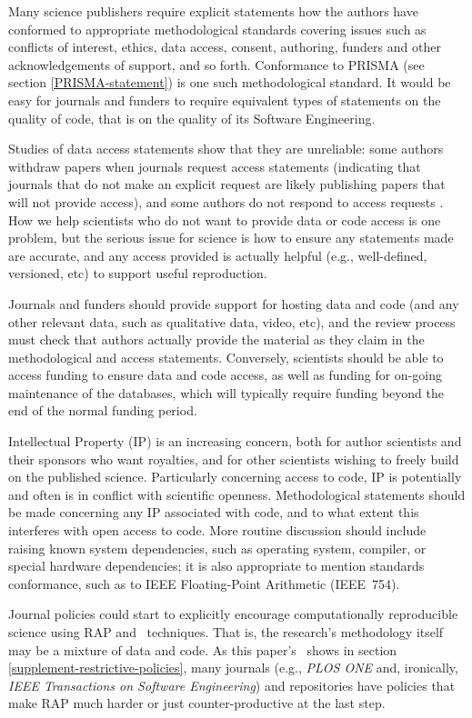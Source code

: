 \documentclass{comjnl}
\begin{document}
Many science publishers require explicit statements how the authors have conformed to appropriate methodological standards covering issues such as conflicts of interest, ethics, data access, consent, authoring, funders and other acknowledgements of support, and so forth. Conformance to PRISMA (see section \ref{PRISMA-statement}) is one such methodological standard. It would be easy for journals and funders to require equivalent types of statements on the quality of code, that is on the quality of its Software Engineering.

Studies of data access statements show that they are unreliable: some authors withdraw papers when journals request access statements \cite{no-raw-data} (indicating that journals that do not make an explicit request are likely publishing papers that will not provide access), and some authors do not respond to access requests \cite{data-access}. How we help scientists who do not want to provide data or code access is one problem, but the serious issue for science is how to ensure any statements made are accurate, and any access provided is actually helpful (e.g., well-defined, versioned, etc) to support useful reproduction. 

Journals and funders should provide support for hosting data and code (and any other relevant data, such as qualitative data, video, etc), and the review process must check that authors actually provide the material as they claim in the methodological and access statements. Conversely, scientists should be able to access funding to ensure data and code access, as well as funding for on-going maintenance of the databases, which will typically require funding beyond the end of the normal funding period.

Intellectual Property (IP) is an increasing concern, both for author scientists and their sponsors who want royalties, and for other scientists wishing to freely build on the published science. Particularly concerning access to code, IP is potentially and often is in conflict with scientific openness. Methodological statements should be made concerning any IP associated with code, and to what extent this interferes with open access to code. More routine discussion should include raising known system dependencies, such as operating system, compiler, or special hardware dependencies; it is also appropriate to mention standards conformance, such as to IEEE Floating-Point Arithmetic (IEEE~754).

\label{mentionPLOSandIEEE}
Journal policies could start to explicitly encourage computationally reproducible science using RAP and \RAPstar\ techniques. That is, the research's methodology itself may be a mixture of data and code. As this paper's \supplement\ shows in section \ref{supplement-restrictive-policies}, many journals (e.g., \emph{PLOS ONE\/} and, ironically, \emph{IEEE Transactions on Software Engineering\/}) and repositories have policies that make RAP much harder or just counter-productive at the last step. 
\end{document}
